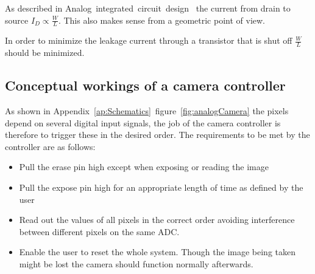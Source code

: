 As described in Analog~integrated~circuit~design~\cite{AnalogBook} the current from drain to source $I_D \propto \frac{W}{L}$.
This also makes sense from a geometric point of view.

In order to minimize the leakage current through a transistor that is shut off $\frac{W}{L}$ should be minimized.

\subsection{Conceptual workings of a camera controller}

As shown in Appendix~\ref{ap:Schematics}~figure~\ref{fig:analogCamera} the pixels depend on several digital input signals,
the job of the camera controller is therefore to trigger these in the desired order.
The requirements to be met by the controller are as follows:

\begin{itemize}
\item Pull the erase pin high except when exposing or reading the image
\item Pull the expose pin high for an appropriate length of time as defined by the user
\item Read out the values of all pixels in the correct order avoiding interference between different pixels on the same ADC.
\item Enable the user to reset the whole system. Though the image being taken might be lost the camera should function normally afterwards.
\end{itemize}

